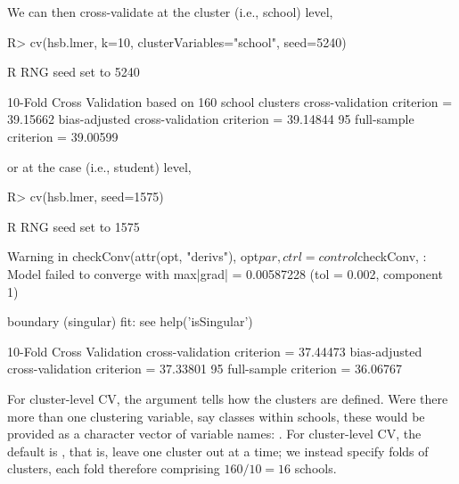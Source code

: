\documentclass[
]{jss}
\begin{document}
We can then cross-validate at the cluster (i.e., school) level,

\begin{CodeChunk}
\begin{CodeInput}
R> cv(hsb.lmer, k=10, clusterVariables="school", seed=5240)
\end{CodeInput}
\begin{CodeOutput}
R RNG seed set to 5240
\end{CodeOutput}
\begin{CodeOutput}
10-Fold Cross Validation based on 160 {school} clusters
cross-validation criterion = 39.15662
bias-adjusted cross-validation criterion = 39.14844
95%
full-sample criterion = 39.00599 
\end{CodeOutput}
\end{CodeChunk}

or at the case (i.e., student) level,

\begin{CodeChunk}
\begin{CodeInput}
R> cv(hsb.lmer, seed=1575)
\end{CodeInput}
\begin{CodeOutput}
R RNG seed set to 1575
\end{CodeOutput}
\begin{CodeOutput}
Warning in checkConv(attr(opt, "derivs"), opt$par, ctrl = control$checkConv, :
Model failed to converge with max|grad| = 0.00587228 (tol = 0.002, component 1)
\end{CodeOutput}
\begin{CodeOutput}
boundary (singular) fit: see help('isSingular')
\end{CodeOutput}
\begin{CodeOutput}
10-Fold Cross Validation
cross-validation criterion = 37.44473
bias-adjusted cross-validation criterion = 37.33801
95%
full-sample criterion = 36.06767 
\end{CodeOutput}
\end{CodeChunk}

For cluster-level CV, the  argument tells
 how the clusters are defined. Were there more than one
clustering variable, say classes within schools, these would be provided
as a character vector of variable names:
. For cluster-level CV,
the default is , that is, leave one cluster out at a
time; we instead specify  folds of clusters, each fold
therefore comprising \(160/10 = 16\) schools.
\end{document}
